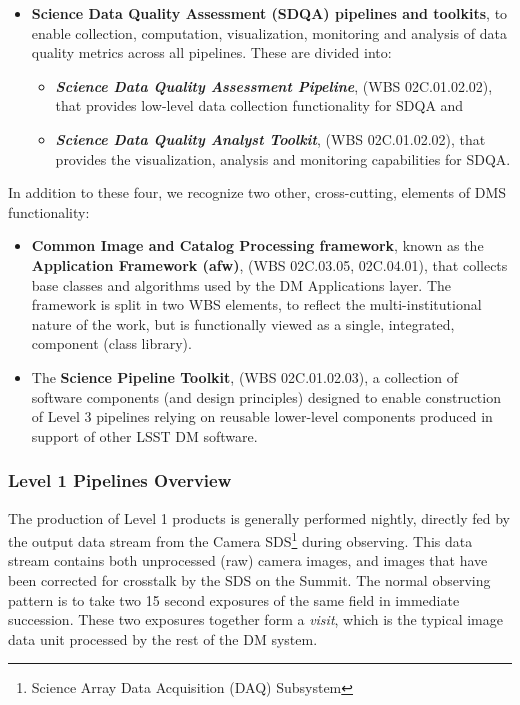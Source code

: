 \documentclass[12pt]{article}
\newcommand{\wbsSDQAP}{WBS 02C.01.02.02}
\newcommand{\wbsSDQAT}{WBS 02C.01.02.02}
\newcommand{\wbsSPT}{WBS 02C.01.02.03}
\newcommand{\wbsAFW}{WBS 02C.03.05, 02C.04.01}
\begin{document}
\begin{itemize}
       \item {\bf Science Data Quality Assessment (SDQA) pipelines and toolkits}, to enable collection, computation, visualization, monitoring and analysis of data quality metrics across all pipelines. These are divided into:
       \begin{itemize}
           \item {\bf \em Science Data Quality Assessment Pipeline}, (\wbsSDQAP), that provides low-level data collection functionality for SDQA and
           \item {\bf \em Science Data Quality Analyst Toolkit}, (\wbsSDQAT), that provides the visualization, analysis and monitoring capabilities for SDQA.
       \end{itemize}

\end{itemize}

In addition to these four, we recognize two other, cross-cutting, elements of DMS functionality:

\begin{itemize}
       \item {\bf Common Image and Catalog Processing framework}, known as the {\bf Application Framework (afw)}, (\wbsAFW), that collects base classes and algorithms %
         used by the DM Applications layer. The framework is split in two WBS elements, to reflect the multi-institutional nature of the work, but is functionally viewed as a single, integrated, component (class library).
       \item The {\bf Science Pipeline Toolkit}, (\wbsSPT), a collection of software components (and design principles) designed to enable construction of Level 3 pipelines relying on reusable lower-level components produced in support of other LSST DM software.
\end{itemize}

\subsubsection{Level 1 Pipelines Overview}
The production of Level 1 products is generally performed nightly, directly fed by 
the output data stream from the Camera SDS\footnote{Science Array Data Acquisition (DAQ) Subsystem} during observing. This data stream
contains both unprocessed (raw) camera images, and images that have been corrected
for crosstalk by the SDS on the Summit.  The normal observing
pattern is to take two 15 second exposures of the same field in immediate
succession.  These two exposures together form a {\em visit}, which is the typical
image data unit processed by the rest of the DM system.
\\
\end{document}
